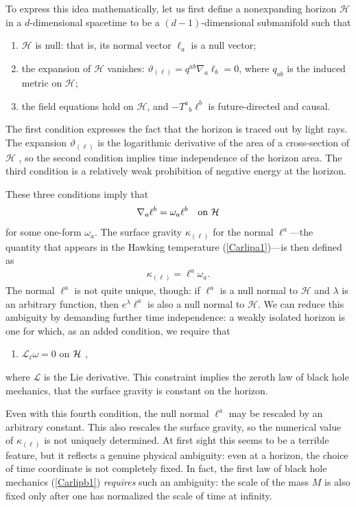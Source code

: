 \documentclass[11pt]{article}
\begin{document}
\begin{appendix}
To express this idea mathematically, let us first define a 
nonexpanding horizon $\mathcal{H}$ in a $d$-dimensional 
spacetime to be a $(d-1)$-dimensional submanifold such that 
\cite{Ashisol,Ashisolb}
\begin{enumerate}
\item $\mathcal{H}$ is null: that is, its normal vector $\ell_a$
 is a null vector;
\item the expansion of $\mathcal{H}$ vanishes: $\vartheta_{(\ell)}
 = q^{ab}\nabla_a\ell_b = 0$, where $q_{ab}$ is the induced metric
 on $\mathcal{H}$;
\item the field equations hold on $\mathcal{H}$, and $-T^a{}_b\ell^b$ 
is future-directed and causal.
\end{enumerate}
The first condition expresses the fact that the horizon is traced
out by light rays.  The expansion $\vartheta_{(\ell)}$ is
the logarithmic derivative of the area of a cross-section of 
$\mathcal{H}$ \cite{Poisson}, so the second condition implies
time independence of the horizon area.  The third condition 
is a relatively weak prohibition of negative energy at the horizon.

These three conditions imply that
$$\nabla_a\ell^b = \omega_a\ell^b \quad\hbox{on $\mathcal{H}$} $$
for some one-form $\omega_a$.  The surface gravity $\kappa_{(\ell)}$ 
for the normal $\ell^a$---the quantity that appears in the Hawking
temperature (\ref{Carlipa1})---is then defined as
\begin{align}
\kappa_{(\ell)} = \ell^a\omega_a .
\label{CarlipApp1}
\end{align}
The normal $\ell^a$ is not quite unique, though: if $\ell^a$ is a null 
normal to $\mathcal{H}$ and $\lambda$ is an arbitrary function, then
$e^\lambda\ell^a$ is also a null normal to $\mathcal{H}$.  We can 
reduce this ambiguity by demanding further time independence:  a 
weakly isolated horizon is one for which, as an added condition,
we require that
\begin{enumerate}{\setcounter{enumi}{3}}
\item ${\mathcal{L}}_\ell\omega = 0$ on $\cal H$ ,
\end{enumerate}
where $\mathcal{L}$ is the Lie derivative.  
This constraint implies the zeroth law of black hole mechanics, that 
the surface gravity is constant on the horizon.   

Even with this fourth condition, the null normal $\ell^a$ may be 
rescaled by an arbitrary constant.  This also rescales the surface 
gravity, so the numerical value of $\kappa_{(\ell)}$ is not uniquely
determined.  
At first sight this seems to be a terrible feature, but it reflects 
a genuine physical ambiguity: even at a horizon, the choice
of time coordinate is not completely fixed.  In fact, the first law of 
black hole mechanics (\ref{Carlipb1}) \emph{requires} such an 
ambiguity: the scale of the mass $M$ is also fixed only after 
one has normalized the scale of time at infinity.


\end{appendix}
\end{document}
